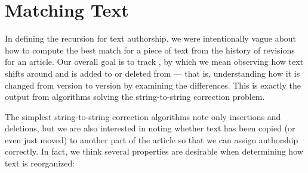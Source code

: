 \section{Matching Text}
\label{sec:diff-greedy}

In defining the recursion for text authorship, we were intentionally
vague about how to compute the best match for a piece of text
from the history of revisions for an article.
Our overall goal is to track ,
by which we mean observing how text shifts
around and is added to or deleted from --- that is,
understanding how it is changed from version to version
by examining the differences.
This is exactly the output from algorithms solving the
string-to-string correction problem.

The simplest string-to-string correction algorithms
note only insertions and deletions, but we are also interested
in noting whether text has been copied (or even just moved)
to another part of the article so that we can assign authorship
correctly.
In fact, we think several properties are desirable
when determining how text is reorganized:
